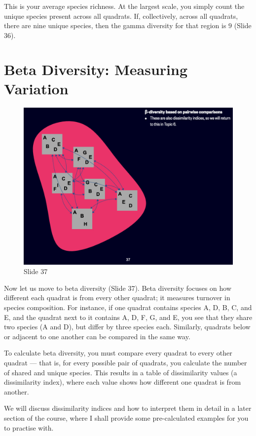 \documentclass[
  10pt,
]{book}
\begin{document}
This is your average species richness. At the largest scale, you simply
count the unique species present across all quadrats. If, collectively,
across all quadrats, there are nine unique species, then the gamma
diversity for that region is \(9\) (Slide 36).

\section{Beta Diversity: Measuring
Variation}\label{beta-diversity-measuring-variation}

\begin{figure}[ht]
\centering
\includegraphics[width=0.8\linewidth]{../images/BDC334/BDC334-037.jpeg}
\caption*{Slide 37}
\end{figure}

Now let us move to beta diversity (Slide 37). Beta diversity focuses on
how different each quadrat is from every other quadrat; it measures
turnover in species composition. For instance, if one quadrat contains
species A, D, B, C, and E, and the quadrat next to it contains A, D, F,
G, and E, you see that they share two species (A and D), but differ by
three species each. Similarly, quadrats below or adjacent to one another
can be compared in the same way.

To calculate beta diversity, you must compare every quadrat to every
other quadrat --- that is, for every possible pair of quadrats, you
calculate the number of shared and unique species. This results in a
table of dissimilarity values (a dissimilarity index), where each value
shows how different one quadrat is from another.

We will discuss dissimilarity indices and how to interpret them in
detail in a later section of the course, where I shall provide some
pre-calculated examples for you to practise with.
\end{document}
